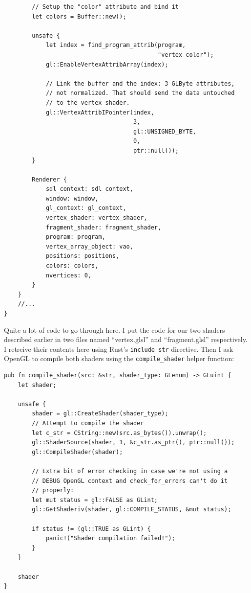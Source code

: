\documentclass[a4paper]{article}
\newcommand{\code}[1] {\texttt{#1}}
\begin{document}
\begin{lstlisting}
        // Setup the "color" attribute and bind it
        let colors = Buffer::new();

        unsafe {
            let index = find_program_attrib(program,
                                            "vertex_color");
            gl::EnableVertexAttribArray(index);

            // Link the buffer and the index: 3 GLByte attributes,
            // not normalized. That should send the data untouched
            // to the vertex shader.
            gl::VertexAttribIPointer(index,
                                     3,
                                     gl::UNSIGNED_BYTE,
                                     0,
                                     ptr::null());
        }

        Renderer {
            sdl_context: sdl_context,
            window: window,
            gl_context: gl_context,
            vertex_shader: vertex_shader,
            fragment_shader: fragment_shader,
            program: program,
            vertex_array_object: vao,
            positions: positions,
            colors: colors,
            nvertices: 0,
        }
    }
    //...
}
\end{lstlisting}

Quite a lot of code to go through here. I put the code for our two
shaders described earlier in two files named ``vertex.glsl'' and
``fragment.glsl'' respectively. I retreive their contents here using
Rust's \code{include\_str} directive. Then I ask OpenGL to compile
both shaders using the \code{compile\_shader} helper function:

\begin{lstlisting}
pub fn compile_shader(src: &str, shader_type: GLenum) -> GLuint {
    let shader;

    unsafe {
        shader = gl::CreateShader(shader_type);
        // Attempt to compile the shader
        let c_str = CString::new(src.as_bytes()).unwrap();
        gl::ShaderSource(shader, 1, &c_str.as_ptr(), ptr::null());
        gl::CompileShader(shader);

        // Extra bit of error checking in case we're not using a
        // DEBUG OpenGL context and check_for_errors can't do it
        // properly:
        let mut status = gl::FALSE as GLint;
        gl::GetShaderiv(shader, gl::COMPILE_STATUS, &mut status);

        if status != (gl::TRUE as GLint) {
            panic!("Shader compilation failed!");
        }
    }

    shader
}
\end{lstlisting}
\end{document}
